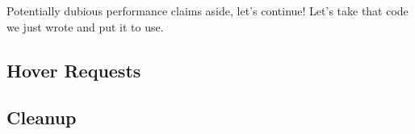 Potentially dubious performance claims aside, let's continue! Let's take that code
we just wrote and put it to use. 

\subsection{Hover Requests}

\subsection{Cleanup}







